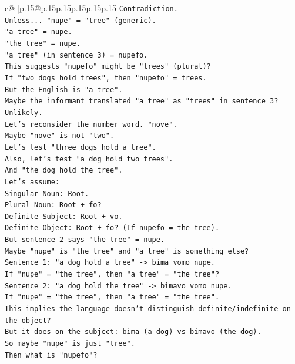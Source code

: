 \documentclass{article}
\begin{document}
{\begin{supertabular}{c@{$\;$}|p{.15\linewidth}@{}p{.15\linewidth}p{.15\linewidth}p{.15\linewidth}p{.15\linewidth}p{.15\linewidth}}
{{{\texttt{Contradiction.} \\
\texttt{Unless... "nupe" = "tree" (generic).} \\
\texttt{"a tree" = nupe.} \\
\texttt{"the tree" = nupe.} \\
\texttt{"a tree" (in sentence 3) = nupefo.} \\
\texttt{This suggests "nupefo" might be "trees" (plural)?} \\
\texttt{If "two dogs hold trees", then "nupefo" = trees.} \\
\texttt{But the English is "a tree".} \\
\texttt{Maybe the informant translated "a tree" as "trees" in sentence 3? Unlikely.} \\
\texttt{Let's reconsider the number word. "nove".} \\
\texttt{Maybe "nove" is not "two".} \\
\texttt{Let's test "three dogs hold a tree".} \\
\texttt{Also, let's test "a dog hold two trees".} \\
\texttt{And "the dog hold the tree".} \\
\texttt{Let's assume:} \\
\texttt{Singular Noun: Root.} \\
\texttt{Plural Noun: Root + fo?} \\
\texttt{Definite Subject: Root + vo.} \\
\texttt{Definite Object: Root + fo? (If nupefo = the tree).} \\
\texttt{But sentence 2 says "the tree" = nupe.} \\
\texttt{Maybe "nupe" is "the tree" and "a tree" is something else?} \\
\texttt{Sentence 1: "a dog hold a tree" {-}> bima vomo nupe.} \\
\texttt{If "nupe" = "the tree", then "a tree" = "the tree"?} \\
\texttt{Sentence 2: "a dog hold the tree" {-}> bimavo vomo nupe.} \\
\texttt{If "nupe" = "the tree", then "a tree" = "the tree".} \\
\texttt{This implies the language doesn't distinguish definite/indefinite on the object?} \\
\texttt{But it does on the subject: bima (a dog) vs bimavo (the dog).} \\
\texttt{So maybe "nupe" is just "tree".} \\
\texttt{Then what is "nupefo"?} \\
}}}
\end{supertabular}}
\end{document}
